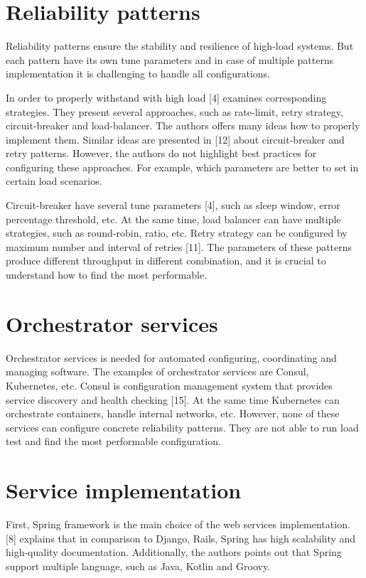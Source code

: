 \section{Reliability patterns}\label{sec:reliablity}

Reliability patterns ensure the stability and resilience of high-load systems.
But each pattern have its own tune parameters and in case of multiple patterns implementation it is challenging to handle all configurations.

In order to properly withstand with high load [4] examines corresponding strategies.
They present several approaches, such as rate-limit, retry strategy, circuit-breaker and load-balancer.
The authors offers many ideas how to properly implement them.
Similar ideas are presented in [12] about circuit-breaker and retry patterns.
However, the authors do not highlight best practices for configuring these approaches.
For example, which parameters are better to set in certain load scenarios.

Circuit-breaker have several tune parameters [4], such as sleep window, error percentage threshold, etc.
At the same time, load balancer can have multiple strategies, such as round-robin, ratio, etc.
Retry strategy can be configured by maximum number and interval of retries [11].
The parameters of these patterns produce different throughput in different combination, and it is crucial to understand how to find the most performable.


\section{Orchestrator services}\label{sec:service-orchestrator}
Orchestrator services is needed for automated configuring, coordinating and managing software.
The examples of orchestrator services are Consul, Kubernetes, etc.
Consul is configuration management system that provides service discovery and health checking [15].
At the same time Kubernetes can orchestrate containers, handle internal networks, etc.
However, none of these services can configure concrete reliability patterns.
They are not able to run load test and find the most performable configuration.


\section{Service implementation}\label{sec:implementation}
First, Spring framework is the main choice of the web services implementation.
[8] explains that in comparison to Django, Rails, Spring has high scalability and high-quality documentation.
Additionally, the authors points out that Spring support multiple language, such as Java, Kotlin and Groovy.

